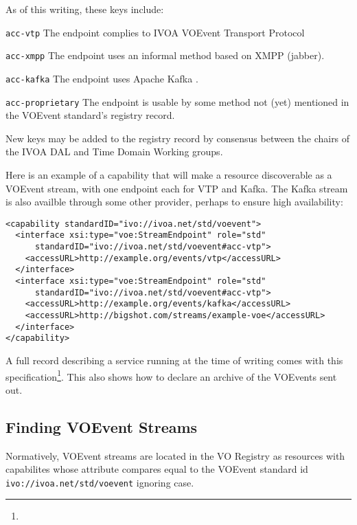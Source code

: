 \documentclass[11pt,a4paper]{ivoa}
\begin{document}
As of this writing, these keys include:

\begin{compactitem}
\item  \verb|acc-vtp| The endpoint complies to IVOA VOEvent Transport
  Protocol \citep{2017ivoa.spec.0320S}
\item \verb|acc-xmpp| The endpoint uses an informal method based on
    	XMPP (jabber).
\item \verb|acc-kafka| The endpoint uses Apache Kafka \citep{kafka}.
\item \verb|acc-proprietary| The endpoint is usable by some
  method not (yet) mentioned in the VOEvent standard's registry record.
\end{compactitem}

New keys may be added to the registry record by consensus between the
chairs of the IVOA DAL and Time Domain Working groups.

Here is an example of a capability that will make a resource
discoverable as a VOEvent stream, with one endpoint each for VTP and
Kafka.  The Kafka stream is also availble through some other
provider, perhaps to ensure high availability:

\begin{lstlisting}
<capability standardID="ivo://ivoa.net/std/voevent">
  <interface xsi:type="voe:StreamEndpoint" role="std"
      standardID="ivo://ivoa.net/std/voevent#acc-vtp">
    <accessURL>http://example.org/events/vtp</accessURL>
  </interface>
  <interface xsi:type="voe:StreamEndpoint" role="std"
      standardID="ivo://ivoa.net/std/voevent#acc-vtp">
    <accessURL>http://example.org/events/kafka</accessURL>
    <accessURL>http://bigshot.com/streams/example-voe</accessURL>
  </interface>
</capability>
\end{lstlisting}

A full record describing a service running at the time of writing
comes with this
specification\footnote{}.  This also
shows how to declare an archive of the VOEvents sent out.

\subsection{Finding VOEvent Streams}

Normatively, VOEvent streams are located in the VO Registry as resources
with capabilites whose  attribute compares equal to
the VOEvent standard id \nolinkurl{ivo://ivoa.net/std/voevent} ignoring
case.
\end{document}
